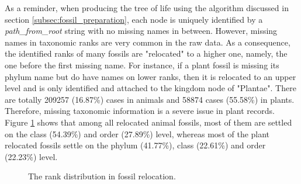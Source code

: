 \documentclass[11pt, a4paper,oneside,chapterprefix=false]{scrbook}
\begin{document}
As a reminder, when producing the tree of life using the algorithm discussed in section \ref{subsec:fossil_preparation}, each node is uniquely identified by a \emph{path\_from\_root} string with no missing names in between. However, missing names in taxonomic ranks are very common in the raw data. As a consequence, the identified ranks of many fossils are "relocated" to a higher one, namely, the one before the first missing name. For instance, if a plant fossil is missing its phylum name but do have names on lower ranks, then it is relocated to an upper level and is only identified and attached to the kingdom node of "Plantae". There are totally 209257 (16.87\%) cases in animals and 58874 cases (55.58\%) in plants. Therefore, missing taxonomic information is a severe issue in plant records. Figure \ref{fig:relocation} shows that among all relocated animal fossils, most of them are settled on the class (54.39\%) and order (27.89\%) level, whereas most of the plant relocated fossils settle on the phylum (41.77\%), class (22.61\%) and order (22.23\%) level. 
\begin{figure}[h]
	\centering
	\hfill
	\caption{The rank distribution in fossil relocation.}
	\label{fig:relocation}
\end{figure}
\end{document}
